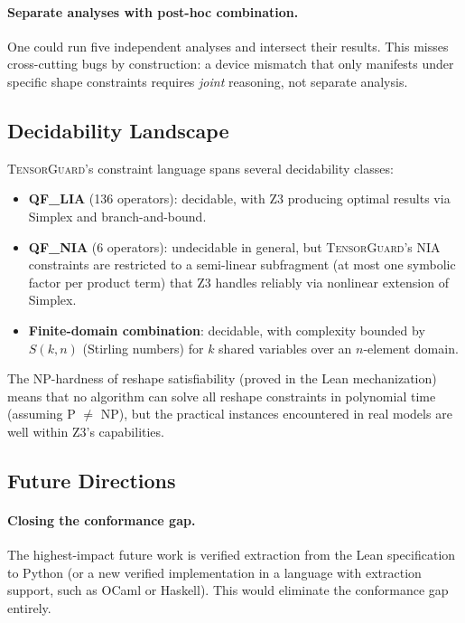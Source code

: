 \documentclass[10pt]{article}
\newcommand{\tguard}{\textsc{TensorGuard}}
\theoremstyle{plain}
\theoremstyle{definition}
\theoremstyle{remark}
\begin{document}
\paragraph{Separate analyses with post-hoc combination.}
One could run five independent analyses and intersect their results.
This misses cross-cutting bugs by construction: a device mismatch
that only manifests under specific shape constraints requires
\emph{joint} reasoning, not separate analysis.

\subsection{Decidability Landscape}

\tguard{}'s constraint language spans several decidability classes:

\begin{itemize}[leftmargin=1.5em]
  \item \textbf{QF\_LIA} (136 operators): decidable, with Z3
    producing optimal results via Simplex and branch-and-bound.
  \item \textbf{QF\_NIA} (6 operators): undecidable in general,
    but \tguard{}'s NIA constraints are restricted to a semi-linear
    subfragment (at most one symbolic factor per product term) that
    Z3 handles reliably via nonlinear extension of Simplex.
  \item \textbf{Finite-domain combination}: decidable, with
    complexity bounded by $S(k, n)$ (Stirling numbers) for $k$
    shared variables over an $n$-element domain.
\end{itemize}

The NP-hardness of reshape satisfiability (proved in the Lean
mechanization) means that no algorithm can solve all reshape
constraints in polynomial time (assuming P $\neq$ NP), but the
practical instances encountered in real models are well within
Z3's capabilities.

\subsection{Future Directions}

\paragraph{Closing the conformance gap.}
The highest-impact future work is verified extraction from the Lean
specification to Python (or a new verified implementation in a
language with extraction support, such as OCaml or Haskell).  This
would eliminate the conformance gap entirely.
\end{document}
